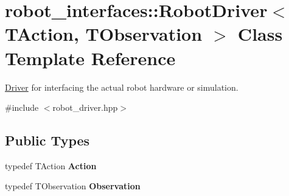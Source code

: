 \hypertarget{classrobot__interfaces_1_1RobotDriver}{}\section{robot\+\_\+interfaces\+:\+:Robot\+Driver$<$ T\+Action, T\+Observation $>$ Class Template Reference}
\label{classrobot__interfaces_1_1RobotDriver}


\hyperlink{classDriver}{Driver} for interfacing the actual robot hardware or simulation.  




{\ttfamily \#include $<$robot\+\_\+driver.\+hpp$>$}

\subsection*{Public Types}
\begin{DoxyCompactItemize}
\item 
\mbox{\label{classrobot__interfaces_1_1RobotDriver_acbba637e7857bef5c7a1e64c9846ead7}} 
typedef T\+Action {\bfseries Action}
\item 
\mbox{\label{classrobot__interfaces_1_1RobotDriver_abcb094711d0ae09fd8e2fc9a6aa771f2}} 
typedef T\+Observation {\bfseries Observation}
\end{DoxyCompactItemize}
